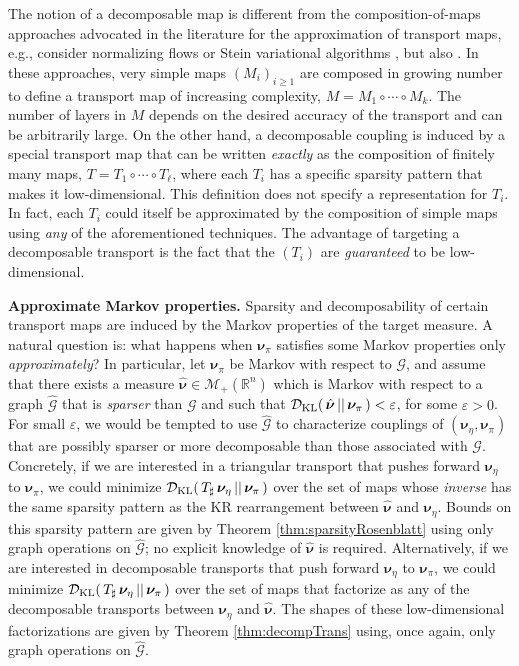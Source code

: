 \documentclass[twoside,11pt]{article}
\newcommand{\push}{_\sharp}                                      %
\newcommand{\borelm}{\mathscr{M}}
\newcommand{\borelmp}{\borelm_+}
\newcommand{\genm}{\boldsymbol{\nu} }   %
\newcommand{\agenm}{\hat{\boldsymbol{\nu}}}   %
\newcommand{\agengr}{\hat{\Gcb}}    %
\newcommand{\re}{\mathbb{R}}
\newcommand{\Gcb}{\boldsymbol{\mathcal{G}}}
\newcommand{\Dkl}{\mathcal{D}_{\rm KL}}         %
\begin{document}
%
The notion of a decomposable map
is different from the composition-of-maps approaches
advocated in the literature for the approximation of
%
%
transport maps, e.g., consider normalizing flows \citep{rezende2015variational} or Stein variational algorithms 
\citep{anderes2012general,liu2016stein,detommaso2018stein}, but also 
\citep{tabak2013family,laparra2011iterative}.   
In these approaches, very simple maps
%
$(M_i)_{i \ge 1}$
are composed in growing number
to define a transport map of increasing complexity, 
$M=M_1\circ  \cdots \circ M_k$.
The %
%
number of layers in $M$ %
depends on the
desired accuracy of the transport and can be arbitrarily large.
On the other hand, a decomposable coupling is induced by a {special}
transport map that can be written {\it exactly} as the composition of
finitely many maps, $T=T_1 \circ \cdots \circ T_\ell$, where each $T_i$ has a specific sparsity
pattern that makes it low-dimensional.
This definition does not specify a
%
%
representation for
$T_i$.
In fact, each $T_i$ 
%
could itself be
%
%
approximated
%
by the composition of
simple maps using {\it any} of the aforementioned techniques.
%
%
%
The advantage of targeting a decomposable transport  is the
fact that the $(T_i)$ are {\it guaranteed} to be low-dimensional.
%
%
%
%
%
%
%
%


%
%
{\bf Approximate Markov properties.}
%
Sparsity and decomposability of certain transport maps are  induced 
by the %
%
%
Markov properties of the target measure. 
%
%
%
%
%
A natural question is: %
what  
%
happens
when 
%
%
$\genm_\pi$ satisfies some Markov properties only {\it approximately}?
In particular, let $\genm_\pi$ be Markov with respect to $\Gcb$, 
%
and assume that
there exists a %
%
measure
$\agenm \in \borelmp(\re^n)$
which is Markov with respect to a graph $\agengr$ that is
%
{\it sparser} %
than $\Gcb$ and
such that 
$\Dkl(\,\agenm \, \vert\vert \, \genm_\pi \,)<\varepsilon$, for some
%
$\varepsilon>0$.
%
%
%
For small $\varepsilon$,
we would be tempted to use %
%
$\agengr$ to
characterize %
%
couplings of  $(\genm_\eta, \genm_\pi)$
that are possibly
sparser
or more decomposable
than those associated with  $\Gcb$.
Concretely, if we are interested in a 
triangular transport that 
pushes forward $\genm_\eta$ to
$\genm_\pi$,
%
we could minimize 
$\Dkl(\,T\push\,\genm_\eta \, \vert\vert \, \genm_\pi \,)$
over the set of %
%
%
maps whose {\it inverse} has the
same sparsity pattern as the
KR rearrangement between
$\agenm$ and $\genm_\eta$.
Bounds on this sparsity pattern are given by 
Theorem \ref{thm:sparsityRosenblatt} using only
graph operations on
$\agengr$;
no explicit knowledge of $\agenm$ is required.
Alternatively, if we are interested in
decomposable transports that 
push forward $\genm_\eta$ to $\genm_\pi$, %
we could minimize 
$\Dkl(\,T\push\,\genm_\eta \, \vert\vert \, \genm_\pi \,)$
over the set of %
maps that  factorize
as any of the decomposable transports
between $\genm_\eta$ and $\agenm$.
The shapes of these low-dimensional factorizations
are given by Theorem \ref{thm:decompTrans}
using, once again, only graph operations on
$\agengr$.
\end{document}
